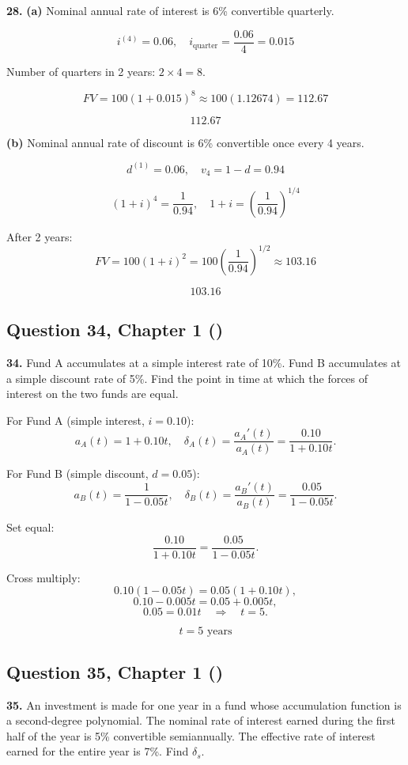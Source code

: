 \documentclass[12pt, a4paper]{article}
\begin{document}
\textbf{28.}
\textbf{(a)} Nominal annual rate of interest is 6\% convertible quarterly.  

\[
i^{(4)} = 0.06, 
\quad i_{\text{quarter}} = \frac{0.06}{4} = 0.015
\]

Number of quarters in 2 years: \( 2 \times 4 = 8 \).  

\[
FV = 100(1+0.015)^8 \approx 100(1.12674) = 112.67
\]

\[
\boxed{112.67}
\]

\bigskip
\textbf{(b)} Nominal annual rate of discount is 6\% convertible once every 4 years.  

\[
d^{(1)} = 0.06, 
\quad v_4 = 1-d = 0.94
\]

\[
(1+i)^4 = \frac{1}{0.94}, 
\quad 1+i = \left(\frac{1}{0.94}\right)^{1/4}
\]

After 2 years:
\[
FV = 100 (1+i)^2 = 100 \left(\frac{1}{0.94}\right)^{1/2} \approx 103.16
\]

\[
\boxed{103.16}
\]

\subsection*{Question 34, Chapter 1  (\cite{toi3rd})}

\textbf{34.} Fund A accumulates at a simple interest rate of 10\%.  
Fund B accumulates at a simple discount rate of 5\%.  
Find the point in time at which the forces of interest on the two funds are equal.

\bigskip
For Fund A (simple interest, \(i = 0.10\)):  
\[
a_A(t) = 1 + 0.10t, 
\quad \delta_A(t) = \frac{a_A'(t)}{a_A(t)} 
= \frac{0.10}{1+0.10t}.
\]

For Fund B (simple discount, \(d = 0.05\)):  
\[
a_B(t) = \frac{1}{1-0.05t}, 
\quad \delta_B(t) = \frac{a_B'(t)}{a_B(t)} 
= \frac{0.05}{1-0.05t}.
\]

Set equal:
\[
\frac{0.10}{1+0.10t} = \frac{0.05}{1-0.05t}.
\]

Cross multiply:
\[
0.10(1-0.05t) = 0.05(1+0.10t),
\]
\[
0.10 - 0.005t = 0.05 + 0.005t,
\]
\[
0.05 = 0.01t \quad \Rightarrow \quad t = 5.
\]

\[
\boxed{t = 5 \text{ years}}
\]

\subsection*{Question 35, Chapter 1  (\cite{toi3rd})}

\textbf{35.} An investment is made for one year in a fund whose accumulation function 
is a second-degree polynomial. The nominal rate of interest earned during the first half 
of the year is 5\% convertible semiannually. The effective rate of interest earned for the entire year is 7\%. Find \(\delta_s\).
\end{document}
